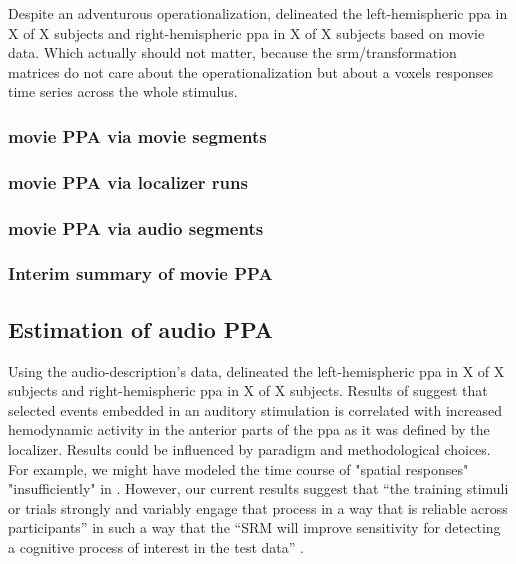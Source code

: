 Despite an adventurous operationalization, \citet{haeusler2022processing}
delineated the left-hemispheric \ac{ppa} in X of X subjects and
right-hemispheric \ac{ppa} in X of X subjects based on movie data.
%
Which actually should not matter, because the \ac{srm}/transformation matrices
do not care about the operationalization but about a voxels responses time
series across the whole stimulus.

\subsubsection{movie PPA via movie segments}

\subsubsection{movie PPA via localizer runs}

\subsubsection{movie PPA via audio segments}

\subsubsection{Interim summary of movie PPA}



\subsection{Estimation of audio PPA}


Using the audio-description's data, \citet{haeusler2022processing} delineated
the left-hemispheric \ac{ppa} in X of X subjects and right-hemispheric \ac{ppa}
in X of X subjects.
%
Results of \citet{haeusler2022processing} suggest that selected events embedded
in an auditory stimulation is correlated with increased hemodynamic activity in
the anterior parts of the \ac{ppa} as it was defined by the localizer.
%
Results could be influenced by paradigm and methodological choices.
%
For example, we might have modeled the time course of "spatial responses"
"insufficiently" in \citep{haeusler2022processing}.
%
However, our current results suggest that ``the training stimuli or trials
strongly and variably engage that process in a way that is reliable across
participants'' in such a way that the ``SRM will improve sensitivity for
detecting a cognitive process of interest in the test data''
\citep{cohen2017computational}.


